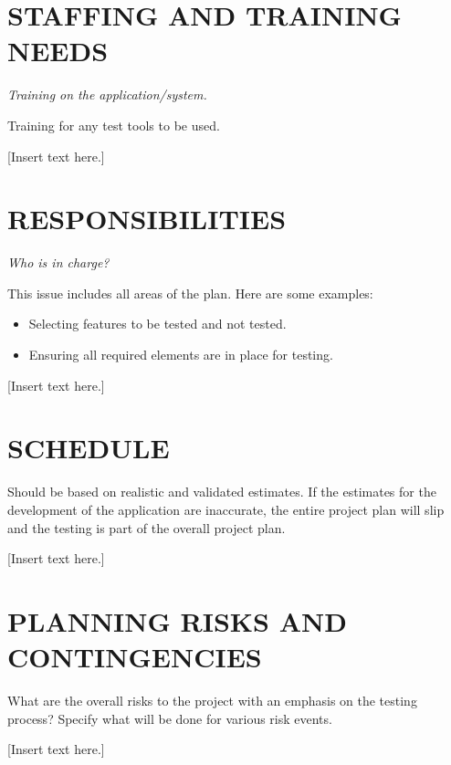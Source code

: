 \section[STAFFING AND TRAINING NEEDS]{\bfseries\color{black}
	 STAFFING AND TRAINING NEEDS}
{\itshape\color{black}
Training on the application/system.

Training for any test tools to be used. 
}
{\color{black}
[Insert text here.]}

\section[RESPONSIBILITIES]{\bfseries\color{black} RESPONSIBILITIES}
{\itshape\color{black}
Who is in charge?

This issue includes all areas of the plan. Here are some examples:

\begin{itemize}
\item Selecting features to be tested and not tested.
\item Ensuring all required elements are in place for testing. 
\end{itemize}
}
{\color{black}
[Insert text here.]}

\section[SCHEDULE]{\bfseries\color{black} SCHEDULE}
{\itshape\color{black}

Should be based on realistic and validated estimates. If the estimates
for the development of the application are inaccurate, the entire
project plan will slip and the testing is part of the overall project plan.

}
{\color{black}
[Insert text here.]}

\section[PLANNING RISKS AND CONTINGENCIES]{\bfseries\color{black}
	 PLANNING RISKS AND CONTINGENCIES}
{\itshape\color{black}

What are the overall risks to the project with an emphasis on the
testing process? Specify what will be done for various risk events.

}
{\color{black}
[Insert text here.]}

